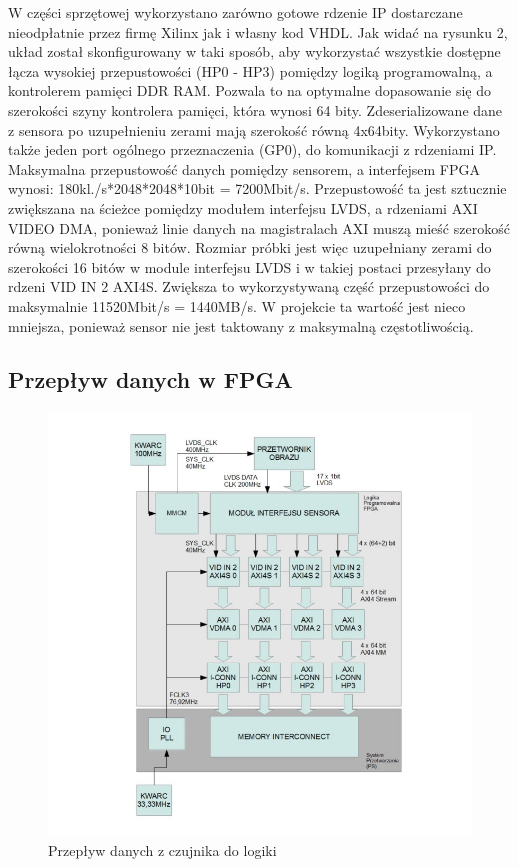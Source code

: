 \documentclass[a4paper,11pt,oneside]{report}  %
\begin{document}
W części sprzętowej wykorzystano zarówno gotowe rdzenie IP dostarczane nieodpłatnie przez firmę Xilinx jak i własny kod VHDL. Jak widać na rysunku 2, układ został skonfigurowany w taki sposób, aby wykorzystać wszystkie dostępne łącza wysokiej przepustowości (HP0 - HP3) pomiędzy logiką programowalną, a kontrolerem pamięci DDR RAM. Pozwala to na optymalne dopasowanie się do szerokości szyny kontrolera pamięci, która wynosi 64 bity. Zdeserializowane dane z sensora po uzupełnieniu zerami mają szerokość równą 4x64bity. Wykorzystano także jeden port ogólnego przeznaczenia (GP0), do komunikacji z rdzeniami IP. Maksymalna przepustowość danych pomiędzy sensorem, a interfejsem FPGA wynosi: 180kl./s*2048*2048*10bit = 7200Mbit/s. Przepustowość ta jest sztucznie zwiększana na ścieżce pomiędzy modułem interfejsu LVDS, a rdzeniami AXI VIDEO DMA, ponieważ linie danych na magistralach AXI muszą mieść szerokość równą wielokrotności 8 bitów. Rozmiar próbki jest więc uzupełniany zerami do szerokości 16 bitów w module interfejsu LVDS i w takiej postaci przesyłany do rdzeni VID IN 2 AXI4S. Zwiększa to wykorzystywaną część przepustowości do maksymalnie 11520Mbit/s = 1440MB/s. W projekcie ta wartość jest nieco mniejsza, ponieważ sensor nie jest taktowany z maksymalną częstotliwością.

\subsection{Przepływ danych w FPGA}
\begin{figure}[H]
	\centering
	\includegraphics[width=15cm]{data.png}
	\caption{Przepływ danych z czujnika do logiki}
	\label{fig:Zynq2}
\end{figure}
 
\end{document}
